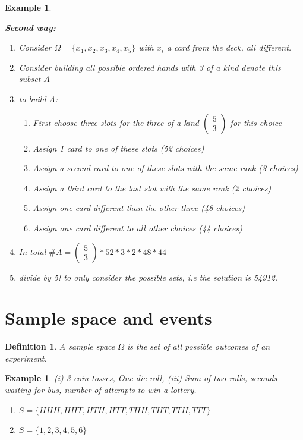 \documentclass[a4paper]{article}
\newcounter{counter}
\numberwithin{counter}{subsection}
\theoremstyle{break}
\newtheorem{definition}{Definition}
\newtheorem{exmp}[counter]{Example}
\begin{document}
\begin{exmp}
\begin{sol}
		\textbf{Second way:} 
		\begin{enumerate}
			\item Consider $\Omega = \{x_1, x_2, x_3, x_4, x_5\}$ with $x_i$ a card from the deck, all different.
			\item Consider building all possible ordered hands with 3 of a kind denote this subset $A$ 
			\item to build A:
			\begin{enumerate}
				\item First choose three slots for the three of a kind $\begin{pmatrix} 5 \\ 3 \end{pmatrix}$ for this choice
				\item Assign 1 card to one of these slots (52 choices)		
				\item Assign a second card to one of these slots with the same rank (3 choices)
				\item Assign a third card to the last slot with the same rank (2 choices)
				\item Assign one card different than the other three (48 choices)  
				\item Assign one card different to all other choices (44 choices)
			\end{enumerate}

			\item In total $\#A = \begin{pmatrix} 5 \\ 3 \end{pmatrix} * 52 * 3 * 2 * 48 * 44$
			\item divide by 5! to only consider the possible sets, i.e the solution is 54912.
		\end{enumerate}
	\end{sol}
\end{exmp}

\section{Sample space and events}%
\label{sec:sample_space_and_events}

\begin{definition}
	A sample space $\Omega$	is the set of all possible outcomes of an experiment.
\end{definition}

\begin{exmp}
	(i) 3 coin tosses, One die roll, (iii) Sum of two	rolls, seconds waiting for bus, number of attempts to win a lottery.  
	\begin{enumerate}
		\item $S = \{HHH, HHT, HTH, HTT, T H H, THT, TTH, TTT\} $
			\item $S = \{1,2,3,4,5,6\} $
	\end{enumerate}
\end{exmp}
\end{document}
